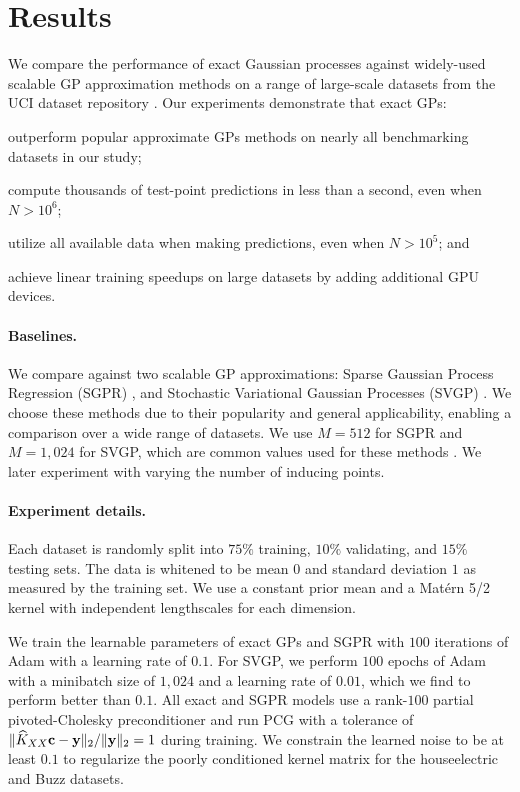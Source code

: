 \section{Results}
\label{sec:largeexact_results}

We compare the performance of exact Gaussian processes against widely-used scalable GP approximation methods on a range of large-scale datasets from the UCI dataset repository \cite{asuncion2007uci}.
Our experiments demonstrate that exact GPs:
\begin{enumerate*}
  \item outperform popular approximate GPs methods on nearly all benchmarking datasets in our study;
  \item compute thousands of test-point predictions in less than a second, even when $N > 10^6$;
  \item utilize all available data when making predictions, even when $N > 10^5$; and
  \item achieve linear training speedups on large datasets by adding additional GPU devices.
\end{enumerate*}

\paragraph{Baselines.}
We compare against two scalable GP approximations: Sparse Gaussian Process Regression (SGPR) \cite{titsias2009variational}, and Stochastic Variational Gaussian Processes (SVGP) \cite{hensman2013gaussian}.
We choose these methods due to their popularity and general applicability, enabling a comparison over a wide range of datasets.
We use $M = 512$ for SGPR and $M = 1,\!024$ for SVGP, which are common values used for these methods \cite{matthews2017gpflow}.
We later experiment with varying the number of inducing points.

\paragraph{Experiment details.}
Each dataset is randomly split into $75\%$ training, $10\%$ validating, and $15\%$ testing sets.
The data is whitened to be mean $0$ and standard deviation $1$ as measured by the training set.
We use a constant prior mean and a Mat\'ern 5/2 kernel with independent lengthscales for each dimension.

We train the learnable parameters of exact GPs and SGPR with $100$ iterations of Adam with a learning rate of $0.1$.
For SVGP, we perform $100$ epochs of Adam with a minibatch size of $1,\!024$ and a learning rate of $0.01$, which we find to perform better than $0.1$.
All exact and SGPR models use a rank-$100$ partial pivoted-Cholesky preconditioner and run PCG with a tolerance of $\Vert \widehat{K}_{XX} \mathbf{c} - \mathbf{y} \Vert_2 / \Vert \mathbf{y} \Vert_2 = 1$ during training.
We constrain the learned noise to be at least $0.1$ to regularize the poorly conditioned kernel matrix for the houseelectric and Buzz datasets.

